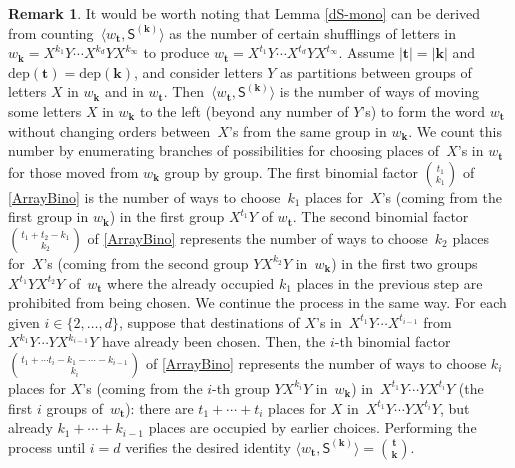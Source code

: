 \documentclass[10pt]{article}
\theoremstyle{definition}
\newtheorem{Remark}[Theorem]{Remark}
\theoremstyle{remark}
\def\bk{{\mathbf{k}}}
\def\SS{{\mathsf{S}}}
\def\dep{\mathrm{dep}}
\def\bt{{\mathbf{t}}}
\def\la{\langle}
\def\ra{\rangle}
\begin{document}
\begin{Remark}
It would be worth noting that 
Lemma \ref{dS-mono} 
can be derived from
counting~$\la w_{\bt}, \SS^{(\bk)} \ra$ 
as the number of certain shufflings of letters in
$w_\bk=X^{k_1}Y\cdots X^{k_d}YX^{k_\infty}$
to produce 
$w_\bt=X^{t_1}Y\cdots X^{t_d}YX^{t_\infty}$.
Assume 
$|\bt|=|\bk|$ and $\dep(\bt)=\dep(\bk)$,
and consider letters $Y$ as partitions between 
groups of letters $X$ in $w_\bk$ and in $w_\bt$. 
Then~$\la w_{\bt}, \SS^{(\bk)} \ra$ is the number of ways
of moving some letters $X$ in $w_\bk$
to the left (beyond any number of $Y$'s)
to form the word $w_\bt$
without changing orders between~$X$'s from the same group
in $w_\bk$.
We count this number 
by enumerating branches of possibilities
for choosing
places of~$X$'s in $w_\bt$ for those moved from 
$w_\bk$ group by group. 
The first binomial factor $\binom{t_1}{k_1}$
of \eqref{ArrayBino} is the number of ways to choose~$k_1$ places for~$X$'s (coming from 
the first group in $w_\bk$) in the first group $X^{t_1}Y$ of $w_\bt$.
The second binomial factor $\binom{t_1+t_2-k_1}{k_2}$ of \eqref{ArrayBino} 
represents the number of ways to choose~$k_2$ 
places for~$X$'s (coming from the second group $YX^{k_2}Y$ in~$w_\bk$)
 in the first two groups $X^{t_1}YX^{t_2}Y$ of~$w_\bt$ 
where the already occupied $k_1$ places in the previous step
are prohibited from being chosen.
We continue the process in the same way. For each given 
$i\in\{2,\dots,d\}$, suppose that destinations of $X$'s 
in~$X^{t_1}Y\cdots X^{t_{i-1}}$ 
from $X^{k_1}Y\cdots YX^{k_{i-1}}Y$ have already been
chosen. Then, the $i$-th binomial
factor $\binom{t_1+\cdots t_i-k_1-\cdots-k_{i-1}}{k_i}$ 
of \eqref{ArrayBino}
represents the number of ways to choose $k_i$ places for 
$X$'s (coming from the $i$-th group $YX^{k_i}Y$ in~$w_\bk$)
in~$X^{t_1}Y\cdots YX^{t_i}Y$ (the first $i$ groups of~$w_\bt$):
there are $t_1+\cdots+t_i$ places for $X$ in~$X^{t_1}Y\cdots YX^{t_i}Y$,
but already $k_1+\cdots+k_{i-1}$ places are occupied 
by earlier choices.
Performing the process until $i=d$ 
verifies the desired identity
$\la w_\bt, \SS^{(\bk)} \ra=\binom{\bt}{\bk}$.
\end{Remark}
\end{document}
